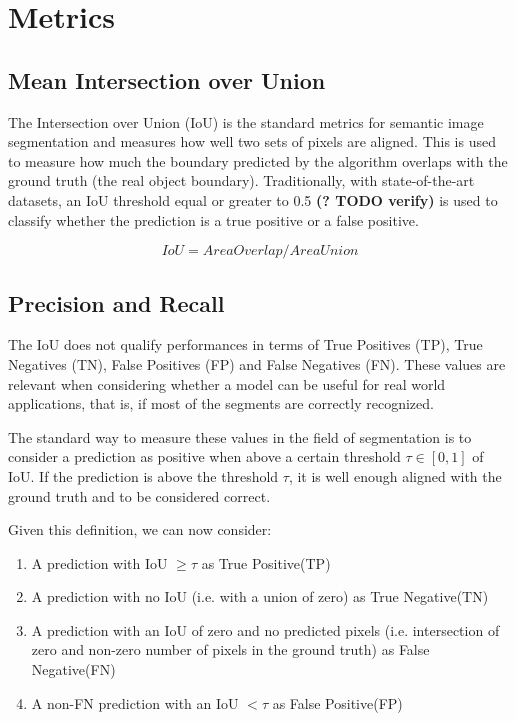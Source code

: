 \documentclass[english, bibtex]{kththesis}
\begin{document}
\section{Metrics}

\subsection{Mean Intersection over Union}

The Intersection over Union (IoU) is the standard metrics for semantic image segmentation and measures how well two sets of pixels are aligned. This is used to measure how much the boundary predicted by the algorithm overlaps with the ground truth (the real object boundary). Traditionally, with state-of-the-art datasets, an IoU threshold equal or greater to 0.5 \textbf{(? TODO verify)} is used to classify whether the prediction is a true positive or a false positive.  

\begin{equation}
	IoU = Area Overlap / Area Union
  	\label{eqn:iou}
\end{equation}


\subsection{Precision and Recall}

The IoU does not qualify performances in terms of True Positives (TP), True Negatives (TN), False Positives (FP) and False Negatives (FN). These values are relevant when considering whether a model can be useful for real world applications, that is, if most of the segments are correctly recognized. 

The standard way to measure these values in the field of segmentation is to consider a prediction as positive when above a certain threshold $\tau \in [0,1]$ of IoU. If the prediction is above the threshold $\tau$, it is well enough aligned with the ground truth and to be considered correct. 

Given this definition, we can now consider:
\begin{enumerate}
\item A prediction with IoU $\geq \tau$ as True Positive(TP)
\item A prediction with no IoU (i.e. with a union of zero) as True Negative(TN)
\item A prediction with an IoU of zero and no predicted pixels (i.e. intersection of zero and non-zero number of pixels in the ground truth) as False Negative(FN)
\item A non-FN prediction with an IoU $< \tau$ as False Positive(FP)
\end{enumerate}
\end{document}
